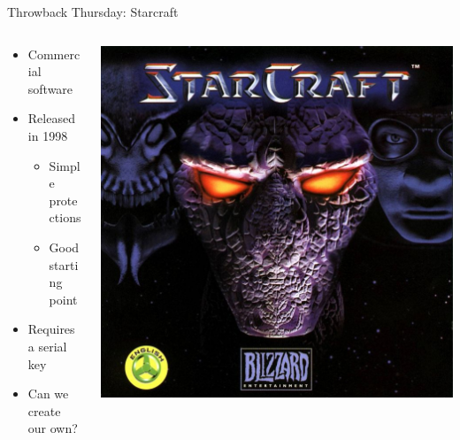 \documentclass[10pt, compress]{beamer}
\begin{document}
\begin{frame}{Throwback Thursday: Starcraft}


	\begin{columns}
		\begin{column}{0.4\textwidth}
			\begin{itemize}
			\item Commercial software
			\item Released in 1998
			\begin{itemize}
				\item Simple protections
				\item Good starting point
			\end{itemize}
			\item Requires a serial key
			\item Can we create our own?
		\end{itemize}
		\end{column}
		\begin{column}{0.6\textwidth}
			\includegraphics[width=\textwidth]{images/starcraft.jpg}
		\end{column}
	\end{columns}

	
\end{frame}
\end{document}
